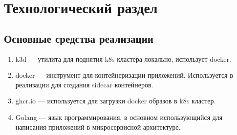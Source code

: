 \chapter{Технологический раздел}

\section{Основные средства реализации}

\begin{enumerate}
\item k3d --- утилита для поднятия k8s кластера локально, использует docker. %
\item docker --- инструмент для контейнеризации приложений. Используется в реализации для создания sidecar контейнеров.
\item ghcr.io --- используется для загрузки docker образов в k8s кластер.
\item Golang --- язык программирования, в основном использующийся для написания приложений в микросервисной архитектуре. %

\end{enumerate}

%	
%
%
